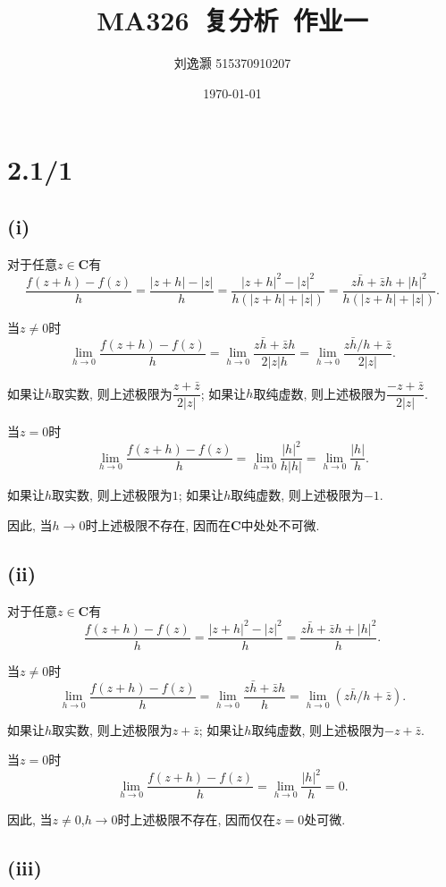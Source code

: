 \documentclass{article}
\title{MA326\ 复分析\ 作业一}
\author{刘逸灏 515370910207}
\date{\today}
\begin{document}
\maketitle

\section{2.1/1}

\subsection*{(i)}

对于任意$z\in\mathbf{C}$有
$$\frac{f(z+h)-f(z)}{h}=\frac{|z+h|-|z|}{h}=\frac{|z+h|^2-|z|^2}{h(|z+h|+|z|)}=\frac{z\bar{h}+\bar{z}h+|h|^2}{h(|z+h|+|z|)}.$$

当$z\neq0$时
$$\lim_{h\to0}\frac{f(z+h)-f(z)}{h}=\lim_{h\to0}\frac{z\bar{h}+\bar{z}h}{2|z|h}=\lim_{h\to0}\frac{z\bar{h}/h+\bar{z}}{2|z|}.$$

如果让$h$取实数, 则上述极限为$\dfrac{z+\bar{z}}{2|z|}$; 如果让$h$取纯虚数, 则上述极限为$\dfrac{-z+\bar{z}}{2|z|}$.

当$z=0$时
$$\lim_{h\to0}\frac{f(z+h)-f(z)}{h}=\lim_{h\to0}\frac{|h|^2}{h|h|}=\lim_{h\to0}\frac{|h|}{h}.$$

如果让$h$取实数, 则上述极限为$1$; 如果让$h$取纯虚数, 则上述极限为$-1$.

因此, 当$h\to0$时上述极限不存在, 因而在$\mathbf{C}$中处处不可微.

\subsection*{(ii)}

对于任意$z\in\mathbf{C}$有
$$\frac{f(z+h)-f(z)}{h}=\frac{|z+h|^2-|z|^2}{h}=\frac{z\bar{h}+\bar{z}h+|h|^2}{h}.$$

当$z\neq0$时
$$\lim_{h\to0}\frac{f(z+h)-f(z)}{h}=\lim_{h\to0}\frac{z\bar{h}+\bar{z}h}{h}=\lim_{h\to0}(z\bar{h}/h+\bar{z}).$$

如果让$h$取实数, 则上述极限为$z+\bar{z}$; 如果让$h$取纯虚数, 则上述极限为$-z+\bar{z}$.

当$z=0$时
$$\lim_{h\to0}\frac{f(z+h)-f(z)}{h}=\lim_{h\to0}\frac{|h|^2}{h}=0.$$

因此, 当$z\neq0$,$h\to0$时上述极限不存在, 因而仅在$z=0$处可微.

\subsection*{(iii)}
\end{document}
